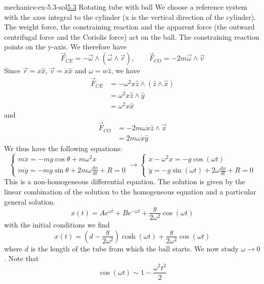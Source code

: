 \documentclass[preview]{standalone}
\begin{document}
\begin{snippetsolution}{mechanics-ex-5.3-sol}{\underline{5.3} Rotating tube with ball}
    We choose a reference system with the axes integral to the cylinder (x is the vertical direction of the cylinder).
    The weight force, the constraining reaction and the apparent force (the outward centrifugal force and the Coriolis force)
    act on the ball. The constraining reaction points on the y-axis.
    We therefore have
    \[
        \vec{F}_{CE} = -\vec{\omega} \wedge (\vec{\omega} \wedge \vec{r}), \qquad \vec{F}_{CO} = -2m\vec{\omega} \wedge \vec{v}
    \]
    Since \(\vec{r} = x\hat{x}\), \(\vec{v} = \dot{x}\hat{x}\) and \(\omega = w\hat{z}\),
    we have
    \begin{align*}
        \vec{F}_{CE} &= -\omega^2 x \hat{z} \wedge (\hat{z} \wedge \hat{x}) \\
        &= \omega^2 x \hat{z} \wedge \hat{y} \\
        &= \omega^2 x \hat{x}
    \end{align*}
    and
    \begin{align*}
        \vec{F}_{CO} &= -2m\omega \dot{x} \hat{z} \wedge \vec{x} \\
        &= 2m\omega \dot{x} \hat{y}
    \end{align*}
    Wr thus have the following equations:
    \[
        \begin{cases}
            m\ddot{x} = -mg\cos\theta + m\omega^2 x \\
            m\ddot{y} = -mg\sin\theta + 2m\omega \frac{dx}{dt} + R = 0
        \end{cases}
        \to
        \begin{cases}
            \ddot{x} - \omega^2 x = -g\cos(\omega t) \\
            \ddot{y} = -g\sin(\omega t) + 2\omega \frac{dx}{dt} + R = 0
        \end{cases}
    \]
    This is a non-homogeneous differential equation. The solution
    is given by the linear combination of the solution to the homogeneous equation and a particular
    general solution.
    \[
        x(t) = Ae^{\omega t} + Be^{-\omega t} + \frac{g}{2\omega^2}\cos(\omega t)
    \]
    with the initial conditions we find
    \[
        x(t) = \left(d-\frac{g}{2\omega^2}\right)
        \cosh(\omega t) + \frac{g}{2\omega^2}\cos(\omega t)
    \]
    where \(d\) is the length of the tube from which the ball starts.
    We now study \(\omega \to 0\).
    Note that
    \[
        \cos(\omega t) \sim 1 - \frac{\omega^2 t^2}{2}
\]
\end{snippetsolution}
\end{document}
